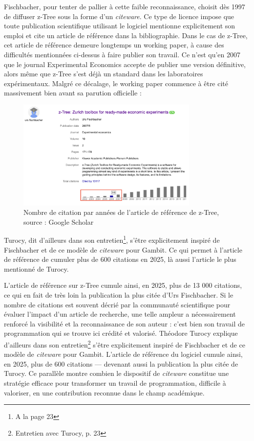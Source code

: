 Fischbacher, pour tenter de pallier à cette faible reconnaissance, choisit dès 1997 de diffuser z-Tree sous la forme d’un \textit{citeware}. Ce type de licence impose que toute publication scientifique utilisant le logiciel mentionne explicitement son emploi et cite un article de référence dans la bibliographie. Dans le cas de z-Tree, cet article de référence demeure longtemps un working paper, à cause des difficultés mentionnées ci-dessus à faire publier son travail. Ce n’est qu’en 2007 que le journal Experimental Economics accepte de publier une version définitive, alors même que z-Tree s'est déjà un standard dans les laboratoires expérimentaux. Malgré ce décalage, le working paper commence à être cité massivement bien avant sa parution officielle :

\begin{figure}[h]
  \centering
  \includegraphics[width=0.8\textwidth]{figures/citation_z_tree.png}
  \caption{Nombre de citation par années de l'article de référence de z-Tree, source : Google Scholar}
  \label{fig:graph_citation_z_tree}
\end{figure}


Turocy, dit d'ailleurs dans son entretien\footnote{A la page 23}, s'être explicitement inspiré de Fischbacher et de ce modèle de \textit{citeware} pour Gambit. Ce qui permet à l'article de référence de cumuler plus de 600 citations en 2025, là aussi l'article le plus mentionné de Turocy.

L’article de référence sur z-Tree \cite{fischbacherz-TreeZurichToolbox2007} cumule ainsi, en 2025, plus de 13 000 citations, ce qui en fait de très loin la publication la plus citée d’Urs Fischbacher. Si le nombre de citations est souvent décrié par la communauté scientifique pour évaluer l'impact d'un article de recherche, une telle ampleur a nécessairement renforcé la visibilité et la reconnaissance de son auteur : c’est bien son travail de programmation qui se trouve ici crédité et valorisé.
Théodore Turocy explique d’ailleurs dans son entretien\footnote{Entretien avec Turocy\cite{turocyInterviewTheodoreTurocy2024}, p. 23} s’être explicitement inspiré de Fischbacher et de ce modèle de \textit{citeware} pour Gambit. L’article de référence du logiciel cumule ainsi, en 2025, plus de 600 citations — devenant aussi la publication la plus citée de Turocy. Ce parallèle montre combien le dispositif de \textit{citeware} constitue une stratégie efficace pour transformer un travail de programmation, difficile à valoriser, en une contribution reconnue dans le champ académique.

